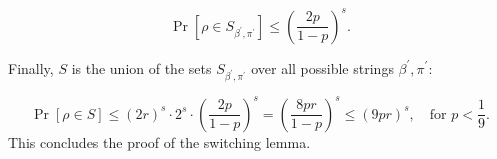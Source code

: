 \[
\Pr \left[ \rho \in S_{\beta^{'},\pi^{'}} \right] \leq \left( \frac{2p}{1 - p} \right)^s.
\]

Finally, \( S \) is the union of the sets \( S_{\beta^{'},\pi^{'}} \) over all possible strings \( \beta^{'},\pi^{'} \):

\[
\Pr \left[ \rho \in S \right] \leq (2r)^s \cdot 2^s \cdot \left( \frac{2p}{1 - p} \right)^s
= \left( \frac{8 p r}{1 - p} \right)^s \leq (9 p r)^s, \quad \text{for } p < \frac{1}{9}.
\]
This concludes the proof of the switching lemma. 



